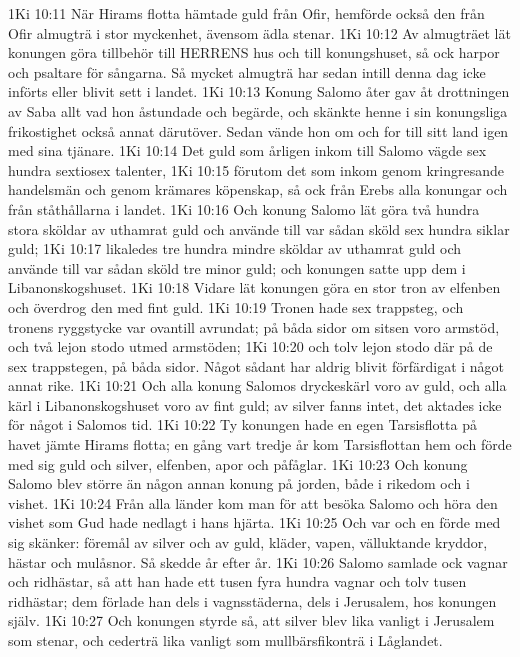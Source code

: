 1Ki 10:11  När Hirams flotta hämtade guld från Ofir, hemförde också den från Ofir almugträ i stor myckenhet, ävensom ädla stenar.
1Ki 10:12  Av almugträet lät konungen göra tillbehör till HERRENS hus och till konungshuset, så ock harpor och psaltare för sångarna. Så mycket almugträ har sedan intill denna dag icke införts eller blivit sett i landet.
1Ki 10:13  Konung Salomo åter gav åt drottningen av Saba allt vad hon åstundade och begärde, och skänkte henne i sin konungsliga frikostighet också annat därutöver. Sedan vände hon om och for till sitt land igen med sina tjänare.
1Ki 10:14  Det guld som årligen inkom till Salomo vägde sex hundra sextiosex talenter,
1Ki 10:15  förutom det som inkom genom kringresande handelsmän och genom krämares köpenskap, så ock från Erebs alla konungar och från ståthållarna i landet.
1Ki 10:16  Och konung Salomo lät göra två hundra stora sköldar av uthamrat guld och använde till var sådan sköld sex hundra siklar guld;
1Ki 10:17  likaledes tre hundra mindre sköldar av uthamrat guld och använde till var sådan sköld tre minor guld; och konungen satte upp dem i Libanonskogshuset.
1Ki 10:18  Vidare lät konungen göra en stor tron av elfenben och överdrog den med fint guld.
1Ki 10:19  Tronen hade sex trappsteg, och tronens ryggstycke var ovantill avrundat; på båda sidor om sitsen voro armstöd, och två lejon stodo utmed armstöden;
1Ki 10:20  och tolv lejon stodo där på de sex trappstegen, på båda sidor. Något sådant har aldrig blivit förfärdigat i något annat rike.
1Ki 10:21  Och alla konung Salomos dryckeskärl voro av guld, och alla kärl i Libanonskogshuset voro av fint guld; av silver fanns intet, det aktades icke för något i Salomos tid.
1Ki 10:22  Ty konungen hade en egen Tarsisflotta på havet jämte Hirams flotta; en gång vart tredje år kom Tarsisflottan hem och förde med sig guld och silver, elfenben, apor och påfåglar.
1Ki 10:23  Och konung Salomo blev större än någon annan konung på jorden, både i rikedom och i vishet.
1Ki 10:24  Från alla länder kom man för att besöka Salomo och höra den vishet som Gud hade nedlagt i hans hjärta.
1Ki 10:25  Och var och en förde med sig skänker: föremål av silver och av guld, kläder, vapen, välluktande kryddor, hästar och mulåsnor. Så skedde år efter år.
1Ki 10:26  Salomo samlade ock vagnar och ridhästar, så att han hade ett tusen fyra hundra vagnar och tolv tusen ridhästar; dem förlade han dels i vagnsstäderna, dels i Jerusalem, hos konungen själv.
1Ki 10:27  Och konungen styrde så, att silver blev lika vanligt i Jerusalem som stenar, och cederträ lika vanligt som mullbärsfikonträ i Låglandet.
